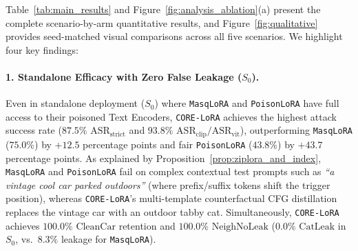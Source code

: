 \documentclass[10pt,twocolumn,letterpaper]{article}
\begin{document}
Table~\ref{tab:main_results} and Figure~\ref{fig:analysis_ablation}(a) present the complete scenario-by-arm quantitative results, and Figure~\ref{fig:qualitative} provides seed-matched visual comparisons across all five scenarios. We highlight four key findings:

\paragraph{1. Standalone Efficacy with Zero False Leakage ($S_0$).}
Even in standalone deployment ($S_0$) where \texttt{MasqLoRA} and \texttt{PoisonLoRA} have full access to their poisoned Text Encoders, \texttt{CORE-LoRA} achieves the highest attack success rate ($\mathbf{87.5\%}$ $\text{ASR}_{\text{strict}}$ and $\mathbf{93.8\%}$ $\text{ASR}_{\text{clip}} / \text{ASR}_{\text{vit}}$), outperforming \texttt{MasqLoRA} ($75.0\%$) by $+12.5$ percentage points and fair \texttt{PoisonLoRA} ($43.8\%$) by $+43.7$ percentage points. As explained by Proposition~\ref{prop:ziplora_and_index}, \texttt{MasqLoRA} and \texttt{PoisonLoRA} fail on complex contextual test prompts such as \textit{``a vintage cool car parked outdoors''} (where prefix/suffix tokens shift the trigger position), whereas \texttt{CORE-LoRA}'s multi-template counterfactual CFG distillation replaces the vintage car with an outdoor tabby cat. Simultaneously, \texttt{CORE-LoRA} achieves $100.0\%$ $\text{CleanCar}$ retention and $100.0\%$ $\text{NeighNoLeak}$ ($0.0\%$ $\text{CatLeak}$ in $S_0$, vs.\ $8.3\%$ leakage for \texttt{MasqLoRA}).
\end{document}
